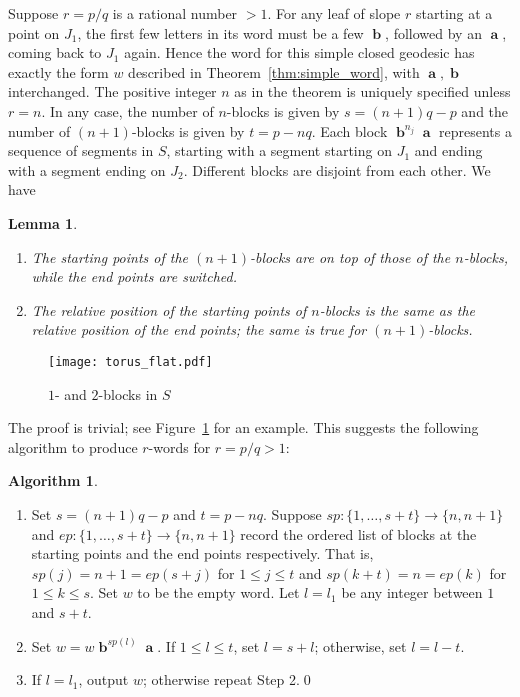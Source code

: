 \documentclass[11pt]{article} %
\theoremstyle{plain}
\newtheorem{lm}[thm]{Lemma}
\theoremstyle{definition}
\newtheorem{alg}[thm]{Algorithm}
\DeclareMathOperator{\bolda}{\mathbf{a}}
\DeclareMathOperator{\boldb}{\mathbf{b}}
\numberwithin{equation}{section}
\begin{document}
Suppose $r=p/q$ is a rational number $>1$. For any leaf of slope $r$ starting at a point on $J_1$, the first few letters in its word must be a few $\boldb$, followed by an $\bolda$, coming back to $J_1$ again. Hence the word for this simple closed geodesic has exactly the form $w$ described in Theorem~\ref{thm:simple_word}, with $\bolda,\boldb$ interchanged. The positive integer $n$ as in the theorem is uniquely specified unless $r=n$. In any case, the number of $n$-blocks is given by $s=(n+1)q-p$ and the number of $(n+1)$-blocks is given by $t=p-nq$. Each block $\boldb^{n_j}\bolda$ represents a sequence of segments in $S$, starting with a segment starting on $J_1$ and ending with a segment ending on $J_2$. Different blocks are disjoint from each other. We have
\begin{lm}
\begin{enumerate}[label=\normalfont{(\arabic*)}, topsep=0mm, itemsep=0mm]
    \item The starting points of the $(n+1)$-blocks are on top of those of the $n$-blocks, while the end points are switched.
    \item The relative position of the starting points of $n$-blocks is the same as the relative position of the end points; the same is true for $(n+1)$-blocks.
\end{enumerate}
\end{lm}
\begin{figure}[ht!]
    \centering
    \texttt{[image: torus\_flat.pdf]}
    \iffalse
    \begin{tikzpicture}[scale=4,thick]
    \draw[red] (0,0.5)--(0.3,1);
    \draw[red] (0.3,0)--(0.9,1);
    \draw[red] (0.9,0)--(1,0.166666667);
    \draw[blue] (0,0.166666667)--(0.5,1);
    \draw[blue] (0.5,0)--(1,0.833333333);
    \draw[green] (0,0.833333333)--(0.1,1);
    \draw[green] (0.1,0)--(0.7,1);
    \draw[green] (0.7,0)--(1,0.5);
    \draw (0,0)--(0,1)--(1,1)--(1,0)--cycle;
    \node at (0.5,1.05) {$\boldb$};
    \node at (1.07,0.5) {$\bolda$};
    \end{tikzpicture}
    \fi
    \caption{$1$- and $2$-blocks in $S$}
    \label{fig:blocks}
\end{figure}
The proof is trivial; see Figure~\ref{fig:blocks} for an example. This suggests the following algorithm to produce $r$-words for $r=p/q>1$:
\begin{alg}\label{alg:simple_word}
\begin{enumerate}[topsep=0mm, itemsep=0mm]
    \item Set $s=(n+1)q-p$ and $t=p-nq$. Suppose $sp:\{1,\ldots,s+t\}\to\{n,n+1\}$ and $ep:\{1,\ldots,s+t\}\to\{n,n+1\}$ record the ordered list of blocks at the starting points and the end points respectively. That is, $sp(j)=n+1=ep(s+j)$ for $1\le j\le t$ and $sp(k+t)=n=ep(k)$ for $1\le k\le s$. Set $w$ to be the empty word. Let $l=l_1$ be any integer between $1$ and $s+t$.
    \item Set $w=w\boldb^{sp(l)}\bolda$. If $1\le l\le t$, set $l=s+l$; otherwise, set $l=l-t$.
    \item If $l=l_1$, output $w$; otherwise repeat Step 2.\qed
    \end{enumerate}
\end{alg}
\end{document}
